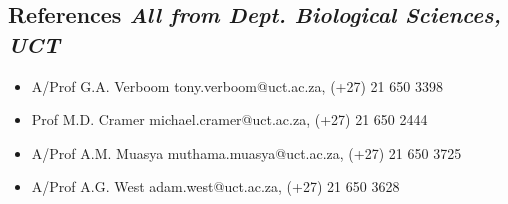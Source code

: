 \documentclass[10pt]{article}
\begin{document}
\hrulefill

\subsection*{
  References
  \hfill {\normalsize \textmd{\textit{All from Dept. Biological Sciences, UCT}}}
}
\begin{itemize}[noitemsep, nolistsep]
\item A/Prof G.A. Verboom \hfill tony.verboom@uct.ac.za, (+27) 21 650 3398
\item Prof M.D. Cramer \hfill michael.cramer@uct.ac.za, (+27) 21 650 2444
\item A/Prof A.M. Muasya \hfill muthama.muasya@uct.ac.za, (+27) 21 650 3725
\item A/Prof A.G. West \hfill adam.west@uct.ac.za, (+27) 21 650 3628
\end{itemize}
\end{document}
